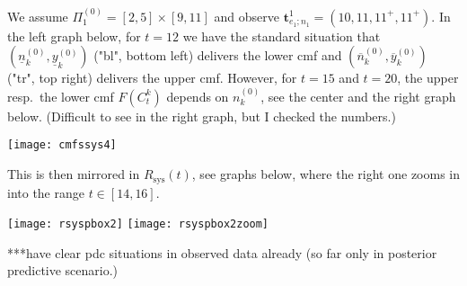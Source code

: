 \documentclass[12pt,a4paper,fleqn]{narms}
\newcommand{\mbf}[1]{\mathbf{#1}}
\newcommand{\uz}{^{(0)}} %
\newcommand{\ul}[1]{\underline{#1}}
\newcommand{\ol}[1]{\overline{#1}}
\newcommand{\Rsys}{R_\text{sys}}
\def\ykzl{\ul{y}\uz_k}
\def\ykzu{\ol{y}\uz_k}
\def\nkz{n\uz_k}
\def\nkzl{\ul{n}\uz_k}
\def\nkzu{\ol{n}\uz_k}
\newcommand{\PZi}[1]{\Pi\uz_{#1}}
\begin{document}
We assume $\PZi{1} = [2,5] \times [9, 11]$ and observe $\mbf{t}^1_{e_1;n_1} = (10, 11, 11^+, 11^+)$.
In the left graph below, for $t=12$ we have the standard situation that
$(\nkzl, \ykzl)$ ("bl", bottom left) delivers the lower cmf and 
$(\nkzu, \ykzu)$ ("tr", top right) delivers the upper cmf.
However, for $t=15$ and $t=20$, the upper resp.\ the lower cmf $F(C_t^k)$ depends on $\nkz$,
see the center and the right graph below.
(Difficult to see in the right graph, but I checked the numbers.)

\texttt{[image: cmfssys4]}

This is then mirrored in $\Rsys(t)$, see graphs below, where the right one zooms in into the range $t \in [14,16]$.

\texttt{[image: rsyspbox2]}
\texttt{[image: rsyspbox2zoom]}

***have clear pdc situations in observed data already (so far only in posterior predictive scenario.)
\end{document}
